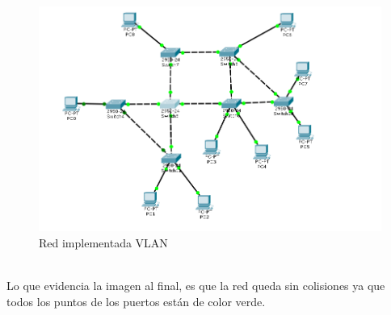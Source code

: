 \documentclass[spanish]{udpreport}
\begin{document}
\begin{figure}[h]
    \centering
    \includegraphics[scale=0.4]{images/4.png}
    \caption{Red implementada VLAN}
    \label{fig:my_label}
\end{figure}
 \\ Lo que evidencia la imagen al final, es que la red queda sin colisiones ya que todos los puntos de los puertos están de color verde.
\end{document}
